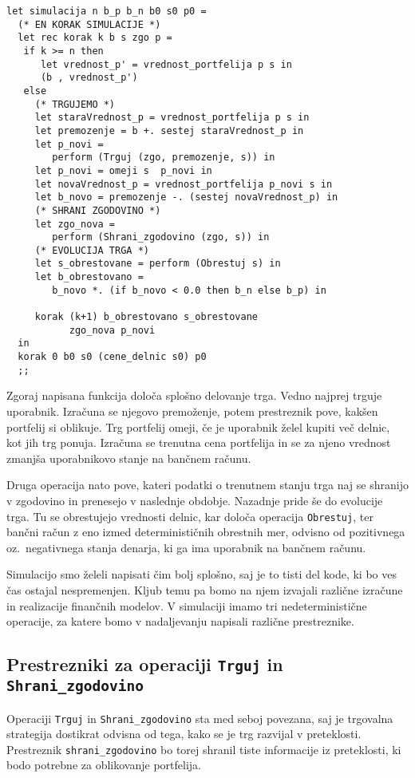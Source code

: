 \documentclass[a4paper,12pt]{article}
\theoremstyle{definition} %
\begin{document}
\begin{lstlisting}
let simulacija n b_p b_n b0 s0 p0 =
  (* EN KORAK SIMULACIJE *)
  let rec korak k b s zgo p =
   if k >= n then
      let vrednost_p' = vrednost_portfelija p s in
      (b , vrednost_p')
   else
     (* TRGUJEMO *)
     let staraVrednost_p = vrednost_portfelija p s in
     let premozenje = b +. sestej staraVrednost_p in
     let p_novi = 
        perform (Trguj (zgo, premozenje, s)) in
     let p_novi = omeji s  p_novi in
     let novaVrednost_p = vrednost_portfelija p_novi s in
     let b_novo = premozenje -. (sestej novaVrednost_p) in
     (* SHRANI ZGODOVINO *)
     let zgo_nova = 
        perform (Shrani_zgodovino (zgo, s)) in
     (* EVOLUCIJA TRGA *)
     let s_obrestovane = perform (Obrestuj s) in
     let b_obrestovano = 
        b_novo *. (if b_novo < 0.0 then b_n else b_p) in

     korak (k+1) b_obrestovano s_obrestovane 
           zgo_nova p_novi
  in
  korak 0 b0 s0 (cene_delnic s0) p0
  ;;
\end{lstlisting}
Zgoraj napisana funkcija določa splošno delovanje trga. Vedno najprej trguje uporabnik. Izračuna se njegovo premoženje, potem prestreznik pove, kakšen portfelij si oblikuje. Trg portfelij omeji, če je uporabnik želel kupiti več delnic, kot jih trg ponuja. Izračuna se trenutna cena portfelija in se za njeno vrednost zmanjša uporabnikovo stanje na bančnem računu.

Druga operacija nato pove, kateri podatki o trenutnem stanju trga naj se shranijo v zgodovino in prenesejo v naslednje obdobje.
Nazadnje pride še do evolucije trga. Tu se obrestujejo vrednosti delnic, kar določa operacija \lstinline{Obrestuj}, ter bančni račun z eno izmed determinističnih obrestnih mer, odvisno od pozitivnega oz.\ negativnega stanja denarja, ki ga ima uporabnik na bančnem računu.

Simulacijo smo želeli napisati čim bolj splošno, saj je to tisti del kode, ki bo ves čas ostajal nespremenjen. Kljub temu pa bomo na njem izvajali različne izračune in realizacije finančnih modelov. V simulaciji imamo tri nedeterministične operacije, za katere bomo v nadaljevanju napisali različne prestreznike.

\subsection{Prestrezniki za operaciji \lstinline{Trguj} in \lstinline{Shrani_zgodovino}}

 Operaciji \lstinline{Trguj} in \lstinline{Shrani_zgodovino} sta med seboj povezana, saj je trgovalna strategija dostikrat odvisna od tega, kako se je trg razvijal v preteklosti. Prestreznik \lstinline{shrani_zgodovino} bo torej shranil tiste informacije iz preteklosti, ki bodo potrebne za oblikovanje portfelija.
\end{document}
